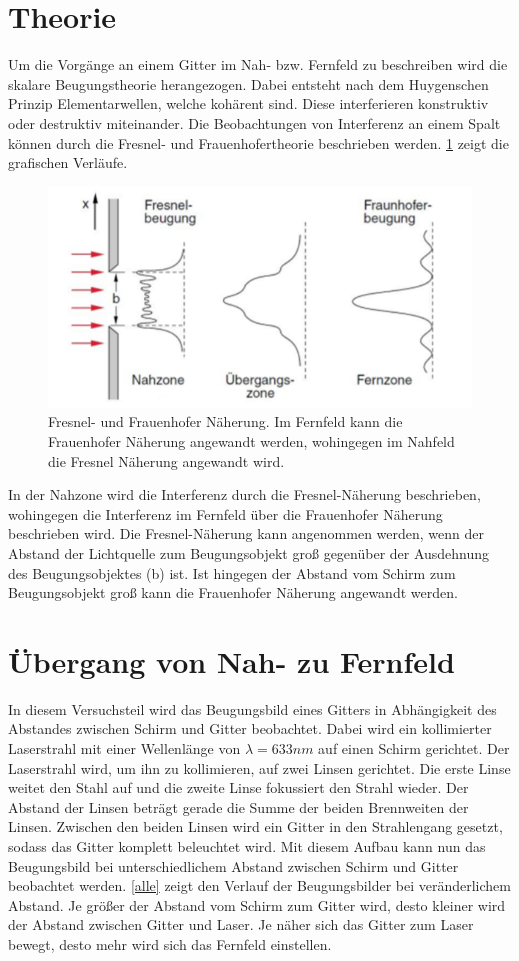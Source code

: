 \section{Theorie}
Um die Vorgänge an einem Gitter im Nah- bzw. Fernfeld zu beschreiben wird die skalare Beugungstheorie herangezogen. Dabei entsteht nach dem Huygenschen Prinzip Elementarwellen, welche kohärent sind. Diese interferieren konstruktiv oder destruktiv miteinander. Die Beobachtungen von Interferenz an einem Spalt können durch die Fresnel- und Frauenhofertheorie beschrieben werden. \cref{Theoriebild} zeigt die grafischen Verläufe.
\begin{figure}[h!]
	\centering
	\includegraphics[scale = 1.5]{abstande.png}
	\caption{Fresnel- und Frauenhofer Näherung. Im Fernfeld kann die Frauenhofer Näherung angewandt werden, wohingegen im Nahfeld die Fresnel Näherung angewandt wird.}
	\label{Theoriebild}
\end{figure}
In der Nahzone wird die Interferenz durch die Fresnel-Näherung beschrieben, wohingegen die Interferenz im Fernfeld über die Frauenhofer Näherung beschrieben wird. Die Fresnel-Näherung kann angenommen werden, wenn der Abstand der Lichtquelle zum Beugungsobjekt groß gegenüber der Ausdehnung des Beugungsobjektes (b) ist. Ist hingegen der Abstand vom Schirm zum Beugungsobjekt groß kann die Frauenhofer Näherung angewandt werden.

\section{Übergang von Nah- zu Fernfeld}
In diesem Versuchsteil wird das Beugungsbild eines Gitters in Abhängigkeit des Abstandes zwischen Schirm und Gitter beobachtet. Dabei wird ein kollimierter Laserstrahl mit einer Wellenlänge von $\lambda = 633 nm$ auf einen Schirm gerichtet. Der Laserstrahl wird, um ihn zu kollimieren, auf zwei Linsen gerichtet. Die erste Linse weitet den Stahl auf und die zweite Linse fokussiert den Strahl wieder. Der Abstand der Linsen beträgt gerade die Summe der beiden Brennweiten der Linsen. Zwischen den beiden Linsen wird ein Gitter in den Strahlengang gesetzt, sodass das Gitter komplett beleuchtet wird. Mit diesem Aufbau kann nun das Beugungsbild bei unterschiedlichem Abstand zwischen Schirm und Gitter beobachtet werden. \cref{alle} zeigt den Verlauf der Beugungsbilder bei veränderlichem Abstand. Je größer der Abstand vom Schirm zum Gitter wird, desto kleiner wird der Abstand zwischen Gitter und Laser. Je näher sich das Gitter zum Laser bewegt, desto mehr wird sich das Fernfeld einstellen.

